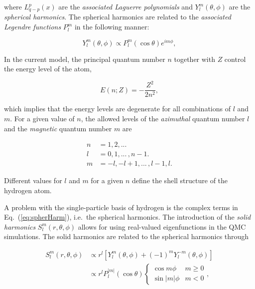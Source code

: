 where $L_{q-p}^p(x)$ are the \textit{associated Laguerre polynomials} and $Y_l^m(\theta, \phi)$ are the \textit{spherical harmonics}. The spherical harmonics are related to the \textit{associated Legendre functions} $P_l^m$ in the following manner:

\begin{equation}
 Y_l^m(\theta, \phi) \propto   P_l^m(\cos\theta)e^{im\phi}, \label{eq:spherHarm}
\end{equation}

In the current model, the principal quantum number $n$ together with $Z$ control the energy level of the atom, 

\begin{equation}
 E(n; Z) = -\frac{Z^2}{2n^2},\label{eq:AtomNonIntEnergy}
\end{equation}

which implies that the energy levels are degenerate for all combinations of $l$ and $m$. For a given value of $n$, the allowed levels of the \textit{azimuthal} quantum number $l$ and the \textit{magnetic} quantum number $m$ are 

\begin{align*}
 n &= 1, 2, ... \\
 l &= 0, 1, ...\,, n-1. \\
 m &= -l, -l + 1, ...\,, l - 1, l.
\end{align*}


Different values for $l$ and $m$ for a given $n$ define the shell structure of the hydrogen atom. 

A problem with the single-particle basis of hydrogen is the complex terms in Eq.~(\ref{eq:spherHarm}), i.e.~the spherical harmonics. The introduction of the \textit{solid harmonics} $S_l^m(r, \theta, \phi)$ allows for using real-valued eigenfunctions in the QMC simulations. The solid harmonics are related to the spherical harmonics through \cite{SolidHarmonics}

\begin{align}
S_l^m(r, \theta, \phi) &\propto r^l\left[Y_l^m(\theta, \phi) + (-1)^m Y_l^{-m}(\theta, \phi)\right] \\
 &\propto r^{l} P_l^{|m|}(\cos\theta) \begin{cases} \cos m\phi & m \ge 0 \\ \sin|m|\phi &  m < 0 \end{cases},                                                                                                     
\end{align}

